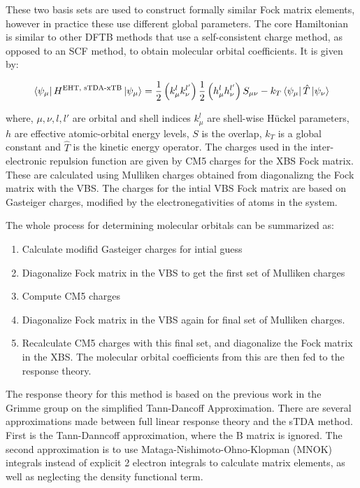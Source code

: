 These two basis sets are used to construct formally similar Fock matrix elements,
however in practice these use different global parameters. The core Hamiltonian
is similar to other DFTB methods that use a self-consistent charge method, as
opposed to an SCF method, to obtain molecular orbital coefficients. It is given by:

\begin{equation}
\bra{\psi_\mu} H^{\text{EHT, sTDA-xTB}} \ket{\psi_\mu}= \frac{1}{2} \left(k^l_\mu k^{l'}_\nu\right) \frac{1}{2} \left(h^l_\mu h^{l'}_\nu\right) S_{\mu\nu} - k_T \bra{\psi_\mu}\hat{T}\ket{\psi_\nu}
\end{equation}

where, $\mu,\nu,l,l'$ are orbital and shell indices  $k^l_\mu$ are shell-wise 
H{\"u}ckel parameters, $h$ are effective atomic-orbital energy levels, $S$ is
the overlap, $k_T$ is a global constant and $\hat{T}$ is the kinetic energy 
operator. The charges used in the inter-electronic repulsion function are given 
by CM5 charges for the XBS Fock matrix. These are calculated using Mulliken 
charges obtained from diagonalizng the Fock matrix with the VBS. The charges for 
the intial VBS Fock matrix are based on Gasteiger charges, modified by the 
electronegativities of atoms in the system.

The whole process for determining molecular orbitals can be summarized as:
\begin{enumerate}
	\item Calculate modifid Gasteiger charges for intial guess
	\item Diagonalize Fock matrix in the VBS to get the first set of Mulliken charges
	\item Compute CM5 charges
	\item Diagonalize Fock matrix in the VBS again for final set of Mulliken charges.
	\item Recalculate CM5 charges with this final set, and diagonalize the Fock matrix in the XBS. The molecular orbital coefficients from this are then fed to the response theory.
\end{enumerate}

The response theory for this method is based on the previous work in the Grimme 
group on the simplified Tann-Dancoff Approximation. There are several approximations 
made between full linear response theory and the sTDA method. First is the 
Tann-Danncoff approximation, where the B matrix is ignored. The second approximation 
is to use Mataga-Nishimoto-Ohno-Klopman (MNOK) integrals instead of explicit 2 electron 
integrals to calculate matrix elements, as well as neglecting the density 
functional term. 

